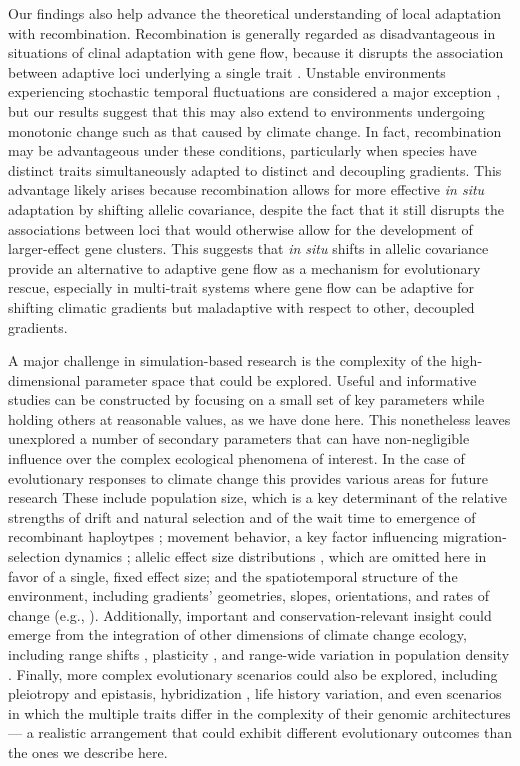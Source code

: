 \documentclass[9pt,twocolumn,twoside,lineno]{new_article}
\begin{document}
Our findings also help advance the theoretical understanding
of local adaptation with recombination.
Recombination is generally regarded as disadvantageous
in situations of clinal adaptation
with gene flow, because it disrupts the
association between adaptive loci 
underlying a single trait \cite{tigano}.
Unstable environments experiencing stochastic temporal fluctuations
are considered a major exception \cite{tigano},
but our results suggest that this may also extend
to environments undergoing monotonic change
such as that caused by climate change.
In fact, recombination may
be advantageous under these conditions,
particularly when species have distinct traits simultaneously adapted
to distinct and decoupling gradients.
This advantage likely arises because recombination
allows for more effective \textit{in situ} adaptation
by shifting allelic covariance, despite the fact that
it still disrupts the associations between loci
that would otherwise allow for the development of
larger-effect gene clusters.
This suggests that \textit{in situ} shifts in allelic covariance
provide an alternative to adaptive gene flow as a mechanism for evolutionary rescue,
especially in multi-trait systems where gene flow can be adaptive
for shifting climatic gradients but maladaptive with
respect to other, decoupled gradients.

A major challenge in simulation-based research is the complexity of the high-dimensional 
parameter space that could be explored.
Useful and informative studies can be constructed by focusing on a small set of
key parameters while holding others at reasonable values, as we have done here.
This nonetheless leaves unexplored a number of secondary parameters
that can have non-negligible influence over the complex ecological phenomena of interest.
In the case of evolutionary responses to climate change
this provides various areas for future research
These include
population size, which is a key determinant of the relative strengths of drift
and natural selection \cite{murray} and of the wait time to emergence of
recombinant haploytpes \cite{christiansen};
movement behavior, a key factor influencing
migration-selection dynamics \cite{wright,haldane,barton};
allelic effect size distributions \cite{orr},
which are omitted here in favor of a single, fixed effect size;
and the spatiotemporal structure of the environment,
including gradients' geometries, slopes, orientations, and rates of change
(e.g., \cite{benes}).
Additionally, important and conservation-relevant insight could emerge from the 
integration of other dimensions of climate change ecology, including range shifts 
\cite{weiss-lehman}, plasticity \cite{chevin},
and range-wide variation in population density \cite{aitken_whitlock}.
Finally, more complex evolutionary scenarios could also be explored, including 
pleiotropy \cite{thompson} and epistasis,
hybridization \cite{turbek}, life history variation,
and even scenarios in which the multiple traits differ in the
complexity of their genomic architectures --- a realistic
arrangement that could exhibit different
evolutionary outcomes than the ones we describe here.
\end{document}
